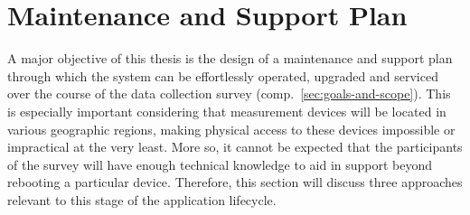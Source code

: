 \section{Maintenance and Support Plan}
\label{sec:maintenance-and-support-plan}

A major objective of this thesis is the design of a maintenance and support plan through which the system can be effortlessly operated, upgraded and serviced over the course of the data collection survey (comp.~\autoref{sec:goals-and-scope}). This is especially important considering that measurement devices will be located in various geographic regions, making physical access to these devices impossible or impractical at the very least. More so, it cannot be expected that the participants of the survey will have enough technical knowledge to aid in support beyond rebooting a particular device. Therefore, this section will discuss three approaches relevant to this stage of the application lifecycle.


